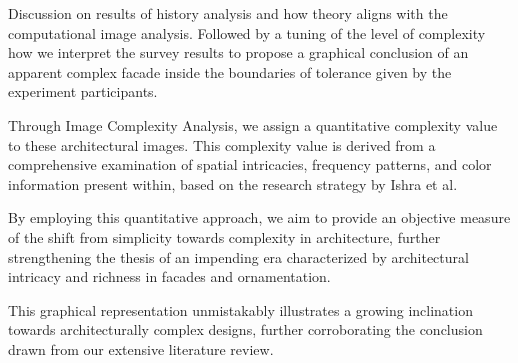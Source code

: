 
Discussion on results of history analysis and how theory aligns with the computational image analysis.
Followed by a tuning of the level of complexity how we interpret the survey results to propose a graphical conclusion of an apparent complex facade inside the boundaries of tolerance given by the experiment participants.


Through Image Complexity Analysis, we assign a quantitative complexity value to these architectural images.
This complexity value is derived from a comprehensive examination of spatial intricacies, frequency patterns, and color information present within, based on the research strategy by Ishra et al\cite{Ishrat2020}.

By employing this quantitative approach, we aim to provide an objective measure of the shift from simplicity towards complexity in architecture, further strengthening the thesis of an impending era characterized by architectural intricacy and richness in facades and ornamentation.

This graphical representation unmistakably illustrates a growing inclination towards architecturally complex designs, further corroborating the conclusion drawn from our extensive literature review.
%
%
%


